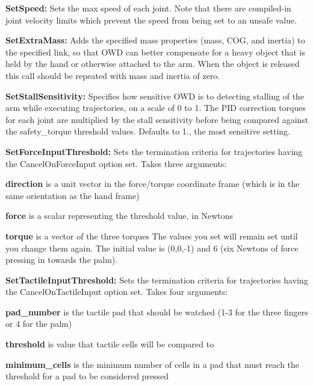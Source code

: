 \begin{DoxyItemize}
\item {\bfseries Set\-Speed\-:} Sets the max speed of each joint. Note that there are compiled-\/in joint velocity limits which prevent the speed from being set to an unsafe value.
\item {\bfseries Set\-Extra\-Mass\-:} Adds the specified mass properties (mass, C\-O\-G, and inertia) to the specified link, so that O\-W\-D can better compensate for a heavy object that is held by the hand or otherwise attached to the arm. When the object is released this call should be repeated with mass and inertia of zero.
\item {\bfseries Set\-Stall\-Sensitivity\-:} Specifies how sensitive O\-W\-D is to detecting stalling of the arm while executing trajectories, on a scale of 0 to 1. The P\-I\-D correction torques for each joint are multiplied by the stall sensitivity before being compared against the safety\-\_\-torque threshold values. Defaults to 1., the most sensitive setting.
\item {\bfseries Set\-Force\-Input\-Threshold\-:} Sets the termination criteria for trajectories having the Cancel\-On\-Force\-Input option set. Takes three arguments\-:
\begin{DoxyItemize}
\item {\bfseries direction} is a unit vector in the force/torque coordinate frame (which is in the same orientation as the hand frame)
\item {\bfseries force} is a scalar representing the threshold value, in Newtons
\item {\bfseries torque} is a vector of the three torques The values you set will remain set until you change them again. The initial value is (0,0,-\/1) and 6 (six Newtons of force pressing in towards the palm).
\end{DoxyItemize}
\item {\bfseries Set\-Tactile\-Input\-Threshold\-:} Sets the termination criteria for trajectories having the Cancel\-On\-Tactile\-Input option set. Takes four arguments\-:
\begin{DoxyItemize}
\item {\bfseries pad\-\_\-number} is the tactile pad that should be watched (1-\/3 for the three fingers or 4 for the palm)
\item {\bfseries threshold} is value that tactile cells will be compared to
\item {\bfseries minimum\-\_\-cells} is the minimum number of cells in a pad that must reach the threshold for a pad to be considered pressed

\end{DoxyItemize}
\end{DoxyItemize}

